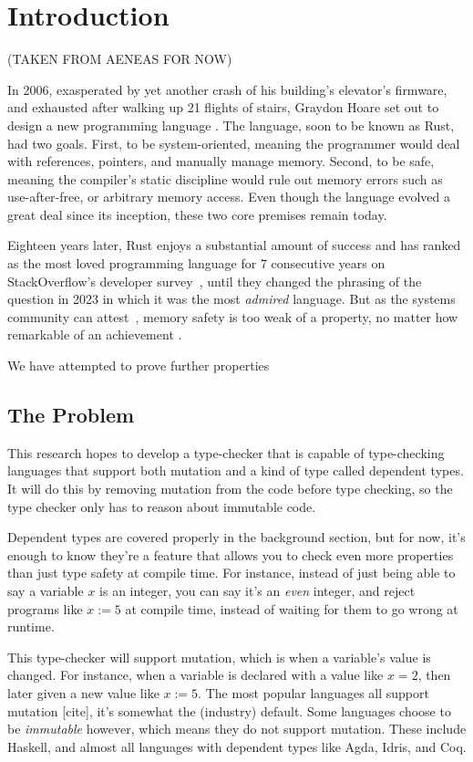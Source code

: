 \documentclass[12pt,twoside]{report}
\begin{document}
\chapter{Introduction}
(TAKEN FROM AENEAS FOR NOW)

In 2006, exasperated by yet another crash of his building's elevator's firmware, and exhausted after walking up 21 flights of stairs, Graydon Hoare set out to design a new programming language \citep{rust-anecdote}. The language, soon to be known as Rust, had two goals. First, to be system-oriented, meaning the programmer would deal with references, pointers, and manually manage memory. Second, to be safe, meaning the compiler's static discipline would rule out memory errors such as use-after-free, or arbitrary memory access. Even though the language evolved a great deal since its inception, these two core premises remain today. 

Eighteen years later, Rust enjoys a substantial amount of success and has ranked as the most loved programming language for 7 consecutive years on StackOverflow's developer survey~\citep{stackoverflow}, until they changed the phrasing of the question in 2023 in which it was the most \textit{admired} language. But as the systems community can attest~\citep{klein2009sel4,lorch2020armada,ferraiuolo2017komodo,bhargavan2017everest}, memory safety is too weak of a property, no matter how remarkable of an achievement .

We have attempted to prove further properties 

\section{The Problem}
This research hopes to develop a type-checker that is capable of type-checking languages that support both mutation and a kind of type called dependent types. It will do this by removing mutation from the code before type checking, so the type checker only has to reason about immutable code.

Dependent types are covered properly in the background section, but for now, it's enough to know they're a feature that allows you to check even more properties than just type safety at compile time. For instance, instead of just being able to say a variable $x$ is an integer, you can say it's an \textit{even} integer, and reject programs like $x := 5$ at compile time, instead of waiting for them to go wrong at runtime.

This type-checker will support mutation, which is when a variable's value is changed. For instance, when a variable is declared with a value like $x = 2$, then later given a new value like $x := 5$. The most popular languages all support mutation [cite], it's somewhat the (industry) default. Some languages choose to be \textit{immutable} however, which means they do not support mutation. These include Haskell, and almost all languages with dependent types like Agda, Idris, and Coq.
\end{document}
